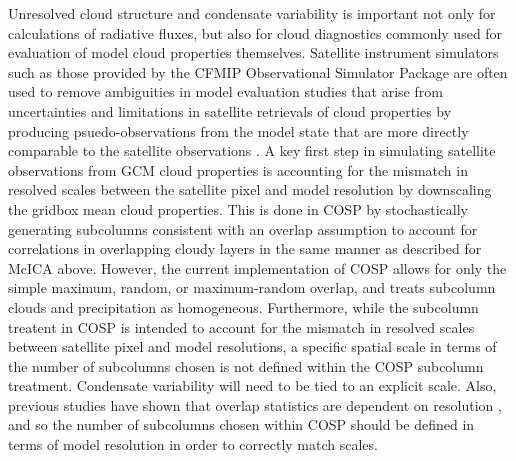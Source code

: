 Unresolved cloud structure and condensate variability is important not only for calculations of radiative fluxes, but also for cloud diagnostics commonly used for evaluation of model cloud properties themselves. Satellite instrument simulators such as those provided by the CFMIP Observational Simulator Package \citep[COSP;][]{bodas-salcedo_et_al_2011} are often used to remove ambiguities in model evaluation studies that arise from uncertainties and limitations in satellite retrievals of cloud properties by producing psuedo-observations from the model state that are more directly comparable to the satellite observations \citep[e.g.,][]{klein_and_jakob_1999,webb_et_al_2001,zhang_et_al_2005,zhang_et_al_2010,kay_et_al_2012,klein_et_al_2013}. A key first step in simulating satellite observations from GCM cloud properties is accounting for the mismatch in resolved scales between the satellite pixel and model resolution by downscaling the gridbox mean cloud properties. This is done in COSP by stochastically generating subcolumns consistent with an overlap assumption to account for correlations in overlapping cloudy layers in the same manner as described for McICA above. However, the current implementation of COSP allows for only the simple maximum, random, or maximum-random overlap, and treats subcolumn clouds and precipitation as homogeneous. Furthermore, while the subcolumn treatent in COSP is intended to account for the mismatch in resolved scales between satellite pixel and model resolutions, a specific spatial scale in terms of the number of subcolumns chosen is not defined within the COSP subcolumn treatment. Condensate variability will need to be tied to an explicit scale. Also, previous studies have shown that overlap statistics are dependent on resolution \citep[e.g.,][]{mace_and_benson-troth_2002}, and so the number of subcolumns chosen within COSP should be defined in terms of model resolution in order to correctly match scales.



